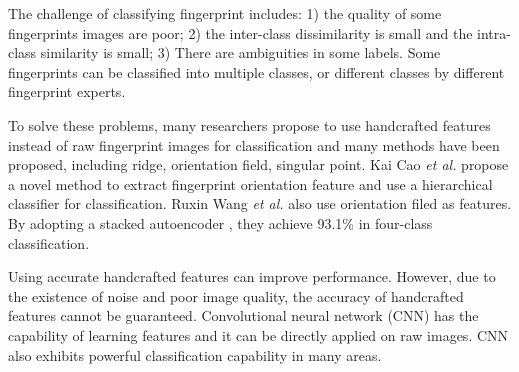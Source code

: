 
The challenge of classifying fingerprint includes: 
%
1) the quality of some fingerprints images are poor; 
%
2) the inter-class dissimilarity is small and the intra-class similarity is small; 
%
3) There are ambiguities in some labels. Some fingerprints can be classified into multiple classes, or different classes by different fingerprint experts.

To solve these problems, many researchers propose to use handcrafted features instead of raw fingerprint images for classification and many methods have been proposed, including ridge, orientation field, singular point.
%
Kai Cao \textit{et al.}\cite{cao2013fingerprint} propose a novel method to extract fingerprint orientation feature and use a hierarchical classifier for classification.
%
Ruxin Wang \textit{et al.} \cite{wang2014fingerprint} also use orientation filed as features. By adopting a stacked autoencoder , they achieve 93.1\% in four-class classification.
%

Using accurate handcrafted features can improve performance.  However, due to the existence of noise and poor image quality, the accuracy of handcrafted features cannot be guaranteed.
%
Convolutional neural network (CNN) has the capability of learning features and it can be directly applied on raw images. CNN also exhibits powerful classification capability in many areas\cite{lecun2015deep}\cite{szegedy2016rethinking}.


